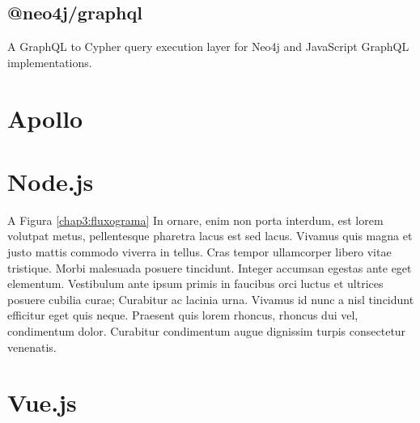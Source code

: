 \subsection{@neo4j/graphql}
A GraphQL to Cypher query execution layer for Neo4j and JavaScript GraphQL implementations.

\section{Apollo}

\section{Node.js}

\label{chap3:sec:fluxograma}

A Figura \ref{chap3:fluxograma} In ornare, enim non porta interdum, est lorem volutpat metus, pellentesque pharetra lacus est sed lacus. Vivamus quis magna et justo mattis commodo viverra in tellus. Cras tempor ullamcorper libero vitae tristique. Morbi malesuada posuere tincidunt. Integer accumsan egestas ante eget elementum. Vestibulum ante ipsum primis in faucibus orci luctus et ultrices posuere cubilia curae; Curabitur ac lacinia urna. Vivamus id nunc a nisl tincidunt efficitur eget quis neque. Praesent quis lorem rhoncus, rhoncus dui vel, condimentum dolor. Curabitur condimentum augue dignissim turpis consectetur venenatis.

\section{Vue.js}



